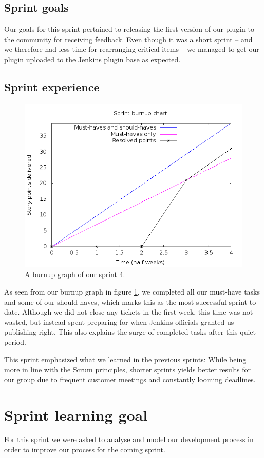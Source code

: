 \documentclass[a4paper,11pt]{article}
\begin{document}
\subsection{Sprint goals}
Our goals for this sprint pertained to releasing the first version of our plugin
to the community for receiving feedback. Even though it was a short sprint -- and
we therefore had less time for rearranging critical items -- we managed to get
our plugin uploaded to the Jenkins plugin base as expected.

\subsection{Sprint experience}
\begin{figure}[!ht]
	\centering
	\includegraphics[width=12cm]{img/burnup.png}
	\caption{A burnup graph of our sprint 4.}
	\label{fig:burnup}
\end{figure}

As seen from our burnup graph in figure \ref{fig:burnup}, we completed all our
must-have tasks and some of our should-haves, which marks this as the most
successful sprint to date. Although we did not close any tickets
in the first week, this time was not wasted, but instead spent preparing for
when Jenkins officials granted us publishing right. This also explains the surge
of completed tasks after this quiet-period.

This sprint emphasized what we learned in the previous sprints: While being more
in line with the Scrum principles, shorter sprints yields better results for our
group due to frequent customer meetings and constantly looming deadlines.

\section{Sprint learning goal}
\label{sec:learning_goals}
For this sprint we were asked to analyse and model our development process in
order to improve our process for the coming sprint.
\end{document}
